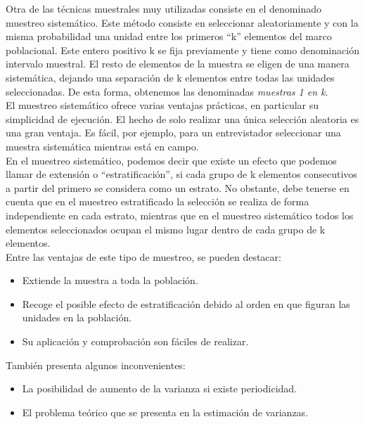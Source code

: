 Otra de las técnicas muestrales muy utilizadas consiste en el denominado muestreo sistemático. Este método consiste en seleccionar aleatoriamente y con la misma probabilidad una unidad entre los primeros ``k'' elementos del marco poblacional. Este entero positivo k se fija previamente y tiene como denominación intervalo muestral. El resto de elementos de la muestra se eligen de una manera sistemática, dejando una separación de k elementos entre todas las unidades seleccionadas. De esta forma, obtenemos las denominadas \textit{muestras 1 en k}.\\

El muestreo sistemático ofrece varias ventajas prácticas, en particular su simplicidad de
ejecución. El hecho de solo realizar una única selección aleatoria es una gran ventaja. Es
fácil, por ejemplo, para un entrevistador seleccionar una muestra sistemática mientras
está en campo.\\

En el muestreo sistemático, podemos decir que existe un efecto que podemos llamar de extensión o ``estratificación'', si cada grupo de k elementos consecutivos a partir del primero se considera como un estrato. No obstante, debe tenerse en cuenta que en el muestreo estratificado la selección se realiza de forma independiente en cada estrato, mientras que en el muestreo sistemático todos los elementos seleccionados ocupan el mismo lugar dentro de cada grupo de k elementos. \\

Entre las ventajas de este tipo de muestreo, se pueden destacar:\\
\begin{itemize}[label=$\bullet$]
    \item Extiende la muestra a toda la población.
    \item Recoge el posible efecto de estratificación debido al orden en que figuran las unidades en la población.
    \item Su aplicación y comprobación son fáciles de realizar.
\end{itemize}

También presenta algunos inconvenientes:\\

\begin{itemize}[label=$\bullet$]
    \item La posibilidad de aumento de la varianza si existe periodicidad.
    \item El problema teórico que se presenta en la estimación de varianzas.
\end{itemize}


